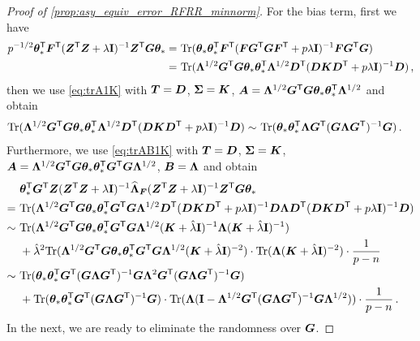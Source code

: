 \begin{proof}[Proof of \cref{prop:asy_equiv_error_RFRR_minnorm}]
For the bias term, first we have
\[
\begin{aligned}
p^{-1/2}\btheta_*^\sT \bF^\sT (\bZ^\sT \bZ + \lambda\id)^{-1} \bZ^\sT \bm{G} \btheta_* =&~ \Tr( \btheta_*\btheta_*^\sT \bF^\sT (\bF\bG^\sT \bG\bF^\sT+ p\lambda\id)^{-1} \bF \bG^\sT \bG)\\
=&~ \Tr(\bLambda^{1/2} \bG^\sT \bG \btheta_*\btheta_*^\sT \bLambda^{1/2} \bD^\sT (\bD \bK \bD^\sT+ p\lambda\id)^{-1} \bD )\,,
\end{aligned}
\]
then we use \cref{eq:trA1K} with $\bT=\bD$, $\bSigma=\bK$, $\bA=\bLambda^{1/2} \bG^\sT \bG \btheta_*\btheta_*^\sT \bLambda^{1/2}$ and obtain
\[
\begin{aligned}
\Tr(\bLambda^{1/2} \bG^\sT \bG \btheta_*\btheta_*^\sT \bLambda^{1/2} \bD^\sT (\bD \bK \bD^\sT+ p\lambda\id)^{-1} \bD ) \sim&~ \Tr( \btheta_*\btheta_*^\sT \bLambda \bG^\sT ( \bG \bLambda \bG^\sT)^{-1} \bG)\,.
\end{aligned}
\]
Furthermore, we use \cref{eq:trAB1K} with $\bT=\bD$, $\bSigma=\bK$, $\bA=\bLambda^{1/2} \bG^\sT \bG \btheta_* \btheta_*^\sT \bG^\sT \bG \bLambda^{1/2}$, $\bB=\bLambda$ and obtain
\[
\begin{aligned}
&~\btheta_*^\sT \bG^\sT \bZ (\bZ^\sT \bZ + \lambda\id)^{-1} \widehat{\bLambda}_{\bF} (\bZ^\sT \bZ + \lambda\id)^{-1} \bZ^\sT \bm{G} \btheta_*\\
=&~\Tr(\bLambda^{1/2} \bG^\sT \bG \btheta_* \btheta_*^\sT \bG^\sT \bG \bLambda^{1/2} \bD^\sT(\bD \bK \bD^\sT + p\lambda\id)^{-1} \bD \bLambda \bD^\sT (\bD \bK \bD^\sT + p\lambda\id)^{-1} \bD )\\
\sim&~ \Tr(\bLambda^{1/2} \bG^\sT \bG \btheta_* \btheta_*^\sT \bG^\sT \bG \bLambda^{1/2} ( \bK + \hat\lambda\id)^{-1} \bLambda ( \bK + \hat\lambda\id)^{-1} )\\
&~+ \hat\lambda^2 \Tr(\bLambda^{1/2} \bG^\sT \bG \btheta_* \btheta_*^\sT \bG^\sT \bG \bLambda^{1/2} ( \bK + \hat\lambda\id)^{-2} ) \cdot \Tr( \bLambda ( \bK + \hat\lambda\id)^{-2} ) \cdot \frac{1}{p-n}\\
\sim&~ \Tr( \btheta_* \btheta_*^\sT \bG^\sT ( \bG \bLambda \bG^\sT )^{-1} \bG \bLambda^2 \bG^\sT ( \bG \bLambda \bG^\sT )^{-1} \bG)\\
&~+ \Tr( \btheta_* \btheta_*^\sT \bG^\sT ( \bG \bLambda \bG^\sT)^{-1} \bG) \cdot \Tr(\bLambda ( \id - \bLambda^{1/2}\bG^\sT (\bG \bLambda \bG^\sT)^{-1} \bG \bLambda^{1/2} ) ) \cdot \frac{1}{p-n}\,.
\end{aligned}
\]
In the next, we are ready to eliminate the randomness over $\bG$.

\end{proof}
